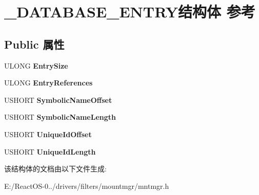 \hypertarget{struct___d_a_t_a_b_a_s_e___e_n_t_r_y}{}\section{\+\_\+\+D\+A\+T\+A\+B\+A\+S\+E\+\_\+\+E\+N\+T\+R\+Y结构体 参考}
\label{struct___d_a_t_a_b_a_s_e___e_n_t_r_y}
\subsection*{Public 属性}
\begin{DoxyCompactItemize}
\item 
\mbox{\label{struct___d_a_t_a_b_a_s_e___e_n_t_r_y_a5f33b654319b841360b8ff60ddc120a6}} 
U\+L\+O\+NG {\bfseries Entry\+Size}
\item 
\mbox{\label{struct___d_a_t_a_b_a_s_e___e_n_t_r_y_a62c11dcfcf8b50f9727d66ac3f2b5fa5}} 
U\+L\+O\+NG {\bfseries Entry\+References}
\item 
\mbox{\label{struct___d_a_t_a_b_a_s_e___e_n_t_r_y_ad4b4f4d9c5e6aa045025f0ae1164ca24}} 
U\+S\+H\+O\+RT {\bfseries Symbolic\+Name\+Offset}
\item 
\mbox{\label{struct___d_a_t_a_b_a_s_e___e_n_t_r_y_a4aea43eff2aa3565d7a2fad0f3451f6d}} 
U\+S\+H\+O\+RT {\bfseries Symbolic\+Name\+Length}
\item 
\mbox{\label{struct___d_a_t_a_b_a_s_e___e_n_t_r_y_a352691a6e81b82231babc39f210078ff}} 
U\+S\+H\+O\+RT {\bfseries Unique\+Id\+Offset}
\item 
\mbox{\label{struct___d_a_t_a_b_a_s_e___e_n_t_r_y_a5718560d058dd68c5cf514ab8fdb1387}} 
U\+S\+H\+O\+RT {\bfseries Unique\+Id\+Length}
\end{DoxyCompactItemize}


该结构体的文档由以下文件生成\+:\begin{DoxyCompactItemize}
\item 
E\+:/\+React\+O\+S-\/0../drivers/filters/mountmgr/mntmgr.\+h\end{DoxyCompactItemize}
